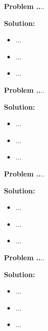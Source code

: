 \documentclass{article}
\theoremstyle{problemstyle}
\newenvironment{boxedproblem}[1]
{\begin{tcolorbox}[colback=white, colframe=black, boxrule=0.5pt]\noindent\textbf{Problem #1.}}
{\end{tcolorbox}}
\begin{document}
    
    \begin{boxedproblem}{36}
    ...
    \end{boxedproblem}
    
    \textbf{Solution:}
    \begin{itemize}[label={},leftmargin=1.25cm,nosep]
        \item ...
        \item ...
        \item ...
    \end{itemize}
    
    
    \begin{boxedproblem}{37}
    ...
    \end{boxedproblem}
    
    \textbf{Solution:}
    \begin{itemize}[label={},leftmargin=1.25cm,nosep]
        \item ...
        \item ...
        \item ...
    \end{itemize}
    
    
    \begin{boxedproblem}{38}
    ...
    \end{boxedproblem}
    
    \textbf{Solution:}
    \begin{itemize}[label={},leftmargin=1.25cm,nosep]
        \item ...
        \item ...
        \item ...
    \end{itemize}
    
    
    \begin{boxedproblem}{39}
    ...
    \end{boxedproblem}
    
    \textbf{Solution:}
    \begin{itemize}[label={},leftmargin=1.25cm,nosep]
        \item ...
        \item ...
        \item ...
    \end{itemize}
    
\end{document}
